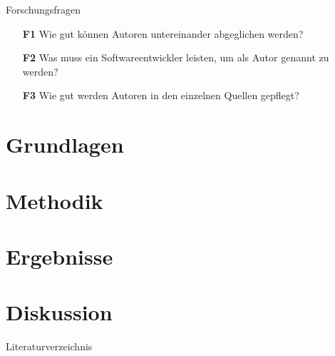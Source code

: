 \documentclass[%
    handout,
    aspectratio=1610,
    10pt,
    onlytextwidth, %
]{beamer}
\begin{document}
\begin{frame}{\secname}{Forschungsfragen}
    \begin{itemize}
      \item[\textbf{F1}] Wie gut können Autoren untereinander abgeglichen werden?
      \item[\textbf{F2}] Was muss ein Softwareentwickler leisten, um als Autor genannt zu werden?
      \item[\textbf{F3}] Wie gut werden Autoren in den einzelnen Quellen gepflegt?
    \end{itemize}
\end{frame}

\section{Grundlagen}
\section{Methodik}
\section{Ergebnisse}
\section{Diskussion}

\begin{frame}{Literaturverzeichnis}
    \printbibliography
\end{frame}

\end{document}
